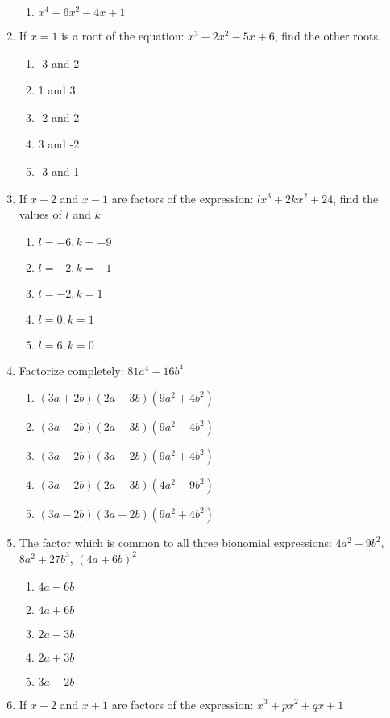 \begin{multicols}{2}
\begin{enumerate}[label={\arabic*.}]
\begin{enumerate}[label={\Alph*.}]
	\item \(x^4-6{x}^{2}-4x+1\)
	\end{enumerate}
\item If \(x=1\) is a root of the equation: \({x}^{3}-2{x}^{2}-5x+6\), find the other roots.
	\begin{enumerate}[label={\Alph*.}]
	\item -3 and 2
	\item 1 and 3
	\item -2 and 2
	\item 3 and -2
	\item -3 and 1
	\end{enumerate}
\item If \(x+2\) and \(x-1\) are factors of the expression: \(l{x}^{3}+2k{x}^{2}+24\), find the values of \(l\) and \(k\)
	\begin{enumerate}[label={\Alph*.}]
	\item \(l=-6, k=-9\)
	\item \(l=-2, k=-1\)
	\item \(l=-2, k=1\)
	\item \(l=0, k=1\)
	\item \(l=6, k=0\)
	\end{enumerate}
\item Factorize completely: \(81a^4-16b^4\)
	\begin{enumerate}[label={\Alph*.}]
	\item \((3a+2b)(2a-3b)(9a^2+4b^2)\)
	\item \((3a-2b)(2a-3b)(9a^2-4b^2)\)
	\item \((3a-2b)(3a-2b)(9a^2+4b^2)\)
	\item \((3a-2b)(2a-3b)(4a^2-9b^2)\)
	\item \((3a-2b)(3a+2b)(9a^2+4b^2)\)
	\end{enumerate}
\item The factor which is common to all three bionomial expressions: \(4a^2-9b^2\), \(8a^2+27b^3\), \((4a+6b)^2\)
	\begin{enumerate}[label={\Alph*.}]
	\item \(4a-6b\)
	\item \(4a+6b\)
	\item \(2a-3b\)
	\item \(2a+3b\)
	\item \(3a-2b\)
	\end{enumerate}
\item If \(x-2\) and \(x+1\) are factors of the expression: \({x}^{3}+p{x}^{2}+qx+1\)
	\begin{enumerate}[label={\Alph*.}]

\end{enumerate}
\end{enumerate}
\end{multicols}

